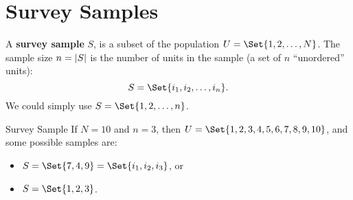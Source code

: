 \section*{Survey Samples}
\begin{Regular}{}
    A \textbf{survey sample} $S$, is a subset of the population
    $ U=\Set{1,2,\ldots,N} $.
    \tcblower{}
    The sample size $ n=\lvert S\rvert $ is the number
    of units in the sample (a set of $ n $ ``unordered'' units):
    \[ S=\Set{i_1,i_2,\ldots,i_n}. \]
    We could simply use $ S=\Set{1,2,\ldots,n} $.
\end{Regular}
\begin{Example}{Survey Sample}
    If $ N=10 $ and $n=3 $, then $U=\Set{1,2,3,4,5,6,7,8,9,10}$,
    and some possible samples are:
    \begin{itemize}
        \item $S=\Set{7,4,9}=\Set{i_1,i_2,i_3}$, or
        \item $S=\Set{1,2,3}$.
    \end{itemize}
\end{Example}
